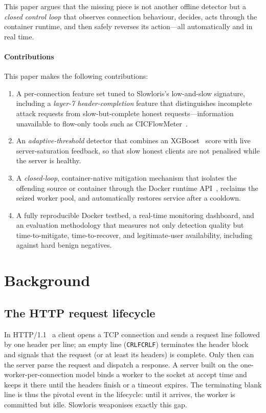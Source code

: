 \documentclass[conference]{IEEEtran}
\begin{document}
This paper argues that the missing piece is not another offline detector but a
\emph{closed control loop} that observes connection behaviour, decides, acts
through the container runtime, and then safely reverses its action---all
automatically and in real time.

\paragraph{Contributions} This paper makes the following contributions:
\begin{enumerate}
  \item A per-connection feature set tuned to Slowloris's low-and-slow
  signature, including a \emph{layer-7 header-completion} feature that
  distinguishes incomplete attack requests from slow-but-complete honest
  requests---information unavailable to flow-only tools such as
  CICFlowMeter~\cite{sharafaldin2018cicids}.
  \item An \emph{adaptive-threshold} detector that combines an
  XGBoost~\cite{chen2016xgboost} score with live server-saturation feedback, so
  that slow honest clients are not penalised while the server is healthy.
  \item A \emph{closed-loop}, container-native mitigation mechanism that isolates
  the offending source or container through the Docker runtime
  API~\cite{docker_engine_api}, reclaims the seized worker pool, and
  automatically restores service after a cooldown.
  \item A fully reproducible Docker testbed, a real-time monitoring dashboard,
  and an evaluation methodology that measures not only detection quality but
  time-to-mitigate, time-to-recover, and legitimate-user availability, including
  against hard benign negatives.
\end{enumerate}

\section{Background}
\subsection{The HTTP request lifecycle}
In HTTP/1.1~\cite{fielding1999http} a client opens a TCP connection and sends a
request line followed by one header per line; an empty line
(\texttt{CRLFCRLF}) terminates the header block and signals that the request (or
at least its headers) is complete. Only then can the server parse the request and
dispatch a response. A server built on the one-worker-per-connection model binds a
worker to the socket at accept time and keeps it there until the headers finish or
a timeout expires. The terminating blank line is thus the pivotal event in the
lifecycle: until it arrives, the worker is committed but idle. Slowloris weaponises
exactly this gap.
\end{document}
